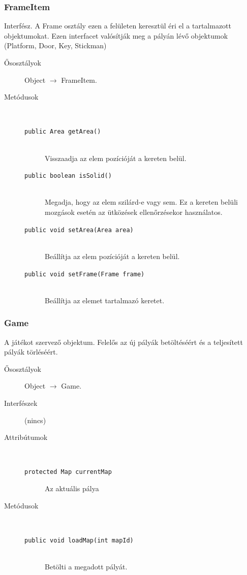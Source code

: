 		\subsubsection{FrameItem} Interfész.
				 A Frame osztály ezen a felületen keresztül éri el a tartalmazott objektumokat.   Ezen interfacet valósítják meg a pályán lévő objektumok (Platform, Door, Key, Stickman) 			\begin{description}


				\item[Ősosztályok] Object $\rightarrow{}$ FrameItem.
				\item[Metódusok]$\ $
					\begin{description}
						\item[\texttt{public Area getArea()}] \hfill \\ Visszaadja az elem pozícióját a kereten belül. 
						\item[\texttt{public boolean isSolid()}] \hfill \\ Megadja, hogy az elem szilárd-e vagy sem.  Ez a kereten belüli mozgások esetén az  ütközések ellenőrzésekor használatos. 
						\item[\texttt{public void setArea(Area area)}] \hfill \\ Beállítja az elem pozícióját a kereten belül. 
						\item[\texttt{public void setFrame(Frame frame)}] \hfill \\ Beállítja az elemet tartalmazó keretet. 
					\end{description}
			\end{description}

		\subsubsection{Game}
				 A játékot szervező objektum. Felelős az új pályák betöltéséért és a teljesített pályák törléséért. 			\begin{description}


				\item[Ősosztályok] Object $\rightarrow{}$ Game.
				\item[Interfészek] (nincs)
				\item[Attribútumok]$\ $
					\begin{description}
						\item[\texttt{protected Map currentMap}] Az aktuális pálya 
					\end{description}
				\item[Metódusok]$\ $
					\begin{description}
						\item[\texttt{public void loadMap(int mapId)}] \hfill \\ Betölti a megadott pályát. 
					\end{description}
			\end{description}

